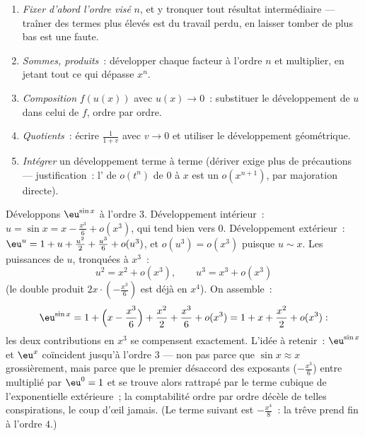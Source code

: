 \begin{method}\label{met:b1:taylor:compute}
\begin{enumerate}
  \item \emph{Fixer d'abord l'ordre visé} $n$, et y tronquer tout
        résultat intermédiaire --- traîner des termes plus élevés est
        du travail perdu, en laisser tomber de plus bas est une faute.
  \item \emph{Sommes, produits}~: développer chaque facteur à l'ordre
        $n$ et multiplier, en jetant tout ce qui dépasse $x^n$.
  \item \emph{Composition} $f(u(x))$ avec $u(x) \to 0$~: substituer
        le développement de $u$ dans celui de $f$, ordre par ordre.
  \item \emph{Quotients}~: écrire $\frac{1}{1 + v}$ avec $v \to 0$ et
        utiliser le développement géométrique.
  \item \emph{Intégrer} un développement terme à terme (dériver exige
        plus de précautions --- justification~: l' de
        $o(t^n)$ de $0$ à $x$ est un $o(x^{n+1})$, par majoration
        directe).
\end{enumerate}
\end{method}

\begin{example}\label{ex:b1:taylor:esin}
Développons $\eu^{\sin x}$ à l'ordre $3$. Développement intérieur~:
$u = \sin x = x - \frac{x^3}{6} + o(x^3)$, qui tend bien vers $0$.
Développement extérieur~: $\eu^u = 1 + u + \frac{u^2}{2} +
\frac{u^3}{6} + o(u^3)$, et $o(u^3) = o(x^3)$ puisque $u \sim x$.
Les puissances de $u$, tronquées à $x^3$~:
\[
u^2 = x^2 + o(x^3), \qquad u^3 = x^3 + o(x^3)
\]
(le double produit $2x\cdot(-\frac{x^3}{6})$ est déjà en $x^4$). On
assemble~:
\[
\eu^{\sin x} = 1 + \Bigl(x - \frac{x^3}{6}\Bigr) + \frac{x^2}{2}
+ \frac{x^3}{6} + o(x^3)
= 1 + x + \frac{x^2}{2} + o(x^3) :
\]
les deux contributions en $x^3$ se compensent exactement. L'idée à
retenir~: $\eu^{\sin x}$ et $\eu^x$ coïncident jusqu'à l'ordre $3$
--- non pas parce que $\sin x \approx x$ grossièrement, mais parce
que le premier désaccord des exposants ($-\frac{x^3}{6}$) entre
multiplié par $\eu^0 = 1$ et se trouve alors rattrapé par le terme
cubique de l'exponentielle extérieure~; la comptabilité ordre par
ordre décèle de telles conspirations, le coup d'œil jamais. (Le
terme suivant est $-\frac{x^4}{8}$~: la trêve prend fin à l'ordre
$4$.)
\end{example}

